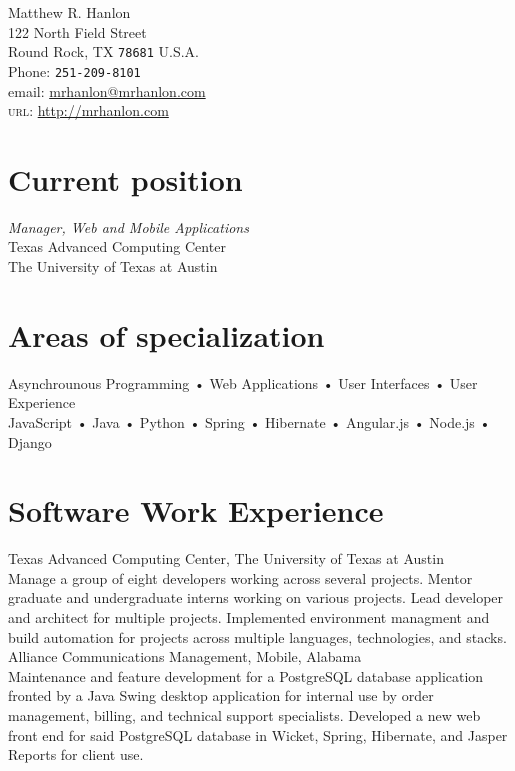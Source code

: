 \documentclass[10pt, a4paper]{article}
\newcommand{\years}[1]{\marginnote{\scriptsize #1}}
\begin{document}
{\LARGE Matthew R. Hanlon}\\[.5cm]
122 North Field Street\\
Round Rock, TX \texttt{78681}
U.S.A.\\[.2cm]
Phone: \texttt{251-209-8101}\\[.2cm]
email: \href{mailto:mrhanlon@mrhanlon.com}{mrhanlon@mrhanlon.com}\\
\textsc{url}: \href{http://mrhanlon.com}{http://mrhanlon.com}\\

\section*{Current position}
\emph{Manager, Web and Mobile Applications}\\
Texas Advanced Computing Center\\
The University of Texas at Austin

\section*{Areas of specialization}
Asynchrounous Programming • Web Applications • User Interfaces • User Experience\\
JavaScript • Java • Python • Spring • Hibernate • Angular.js • Node.js • Django

\section*{Software Work Experience}
\noindent
\years{2010-present}Texas Advanced Computing Center, The University of Texas at Austin\\
{\small Manage a group of eight developers working across several projects. Mentor graduate and undergraduate interns working on various projects. Lead developer and architect for multiple projects. Implemented environment managment and build automation for projects across multiple languages, technologies, and stacks.}\\

\years{2007-2010}Alliance Communications Management, Mobile, Alabama\\
{\small Maintenance and feature development for a PostgreSQL database application fronted by a Java Swing desktop application for internal use by order management, billing, and technical support specialists. Developed a new web front end for said PostgreSQL database in Wicket, Spring, Hibernate, and Jasper Reports for client use.}
\end{document}
